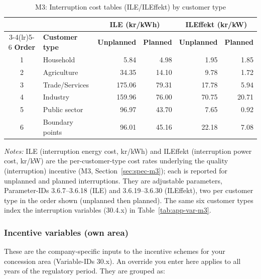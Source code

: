 \begin{table}[H]
\centering
\begin{singlespace}
\footnotesize
\begin{threeparttable}
\caption{M3: Interruption cost tables (ILE/ILEffekt) by customer type}
\label{tab:app-m3-ile}
\begin{tabular}{@{}clrrrr@{}}
\toprule
 & & \multicolumn{2}{c}{\textbf{ILE (kr/kWh)}} & \multicolumn{2}{c}{\textbf{ILEffekt (kr/kW)}} \\
\cmidrule(lr){3-4}\cmidrule(lr){5-6}
\textbf{Order} & \textbf{Customer type} & \textbf{Unplanned} & \textbf{Planned} & \textbf{Unplanned} & \textbf{Planned} \\
\midrule
1 & Household       & 5.84   & 4.98  & 1.95  & 1.85  \\
2 & Agriculture     & 34.35  & 14.10 & 9.78  & 1.72  \\
3 & Trade/Services  & 175.06 & 79.31 & 17.78 & 5.94  \\
4 & Industry        & 159.96 & 76.00 & 70.75 & 20.71 \\
5 & Public sector   & 96.97  & 43.70 & 7.65  & 0.92  \\
6 & Boundary points & 96.01  & 45.16 & 22.18 & 7.08  \\
\bottomrule
\end{tabular}
\begin{tablenotes}
\item \textit{Notes:} ILE (interruption energy cost, kr/kWh) and ILEffekt (interruption power cost, kr/kW) are the per-customer-type cost rates underlying the quality (interruption) incentive (M3, Section~\ref{sec:spec-m3}); each is reported for unplanned and planned interruptions. They are adjustable parameters, Parameter-IDs 3.6.7--3.6.18 (ILE) and 3.6.19--3.6.30 (ILEffekt), two per customer type in the order shown (unplanned then planned). The same six customer types index the interruption variables (30.4.x) in Table~\ref{tab:app-var-m3}.
\end{tablenotes}
\end{threeparttable}
\end{singlespace}
\end{table}

\subsubsection{Incentive variables (own area)}
These are the company-specific inputs to the incentive schemes for your concession area (Variable-IDs 30.x). An override you enter here applies to all years of the regulatory period. They are grouped as:

